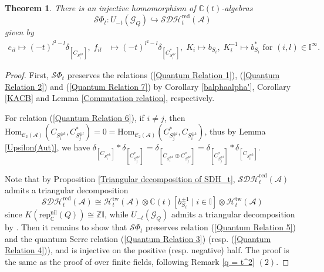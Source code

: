 \documentclass[12pt]{amsart}
\newtheorem{theorem}{Theorem}[section]
\theoremstyle{definition}
\numberwithin{equation}{section}
\begin{document}
\begin{theorem}
    \label{Realization of quantum BB algebra}
    There is an injective homomorphism of $ \mathbb{C}(t) $-algebras
    \[\mathcal{S}\Phi_t : U_{-t}(\mathcal{G}_Q) \hookrightarrow \mathcal{SDH}^{\mathrm{red}}_t(\mathcal{A}) \]
    given by
    \begin{align*}
        e_{il} \mapsto (-t)^{l^2-l} \delta_{[C_{S_i^{\oplus l}}]},\;f_{il} &\mapsto (-t)^{l^2-l} \delta_{[C^*_{S_i^{\oplus l}}]},\; K_i \mapsto b_{S_i} ,\; K_i^{-1} \mapsto b_{S_i}^* \text{ for } (i,l) \in \mathbb{I}^{\infty}.
    \end{align*}
\end{theorem}
\begin{proof}
    First, $ \mathcal{S}\Phi_t $ preserves the relations  (\ref{Quantum Relation 1}), (\ref{Quantum Relation 2}) and (\ref{Quantum Relation 7}) by Corollary \ref{balphaalpha'}, Corollary \ref{KACB} and Lemma \ref{Commutation relation}, respectively. 
    
    For relation (\ref{Quantum Relation 6}), if $ i \ne j $, then $ \mathrm{Hom}_{\mathcal{C}_2(\mathcal{A})}(C_{S_i^{\oplus k}}, C_{S_j^{\oplus l}}^*) = 0 = \mathrm{Hom}_{\mathcal{C}_2(\mathcal{A})}(C_{S_j^{\oplus l}}^*,C_{S_i^{\oplus k}}) $, thus by Lemma \ref{Upsilon(Aut)}, we have $ \delta_{[C_{S_i^{\oplus k}}]} * \delta_{[C_{S_j^{\oplus l}}^*]} = \delta_{[C_{S_i^{\oplus k}} \oplus C_{S_j^{\oplus l}}^*]}  = \delta_{[C_{S_j^{\oplus l}}^*]} * \delta_{[C_{S_i^{\oplus k}}]}  $. 

    Note that by Proposition \ref{Triangular decomposition of SDH_t}, $ \mathcal{SDH}_t^{\mathrm{red}}(\mathcal{A}) $ admits a triangular decomposition 
    \[\mathcal{SDH}^{\mathrm{red}}_t(\mathcal{A}) \cong \mathcal{H}_t^{\mathrm{tw}}(\mathcal{A}) \otimes \mathbb{C}(t)[b_{S_i}^{\pm 1}\mid i \in \mathbb{I}]  \otimes \mathcal{H}_t^{\mathrm{tw}}(\mathcal{A})\]
    since $ K( \mathrm{rep}^{\mathrm{nil}}_{\mathbb{C}}(Q)) \cong \mathbb{Z}\mathbb{I} $, while $ U_{-t}(\mathcal{G}_Q) $ admits a triangular decomposition by \cite[Theorem 3.2]{KangKim20}. 
    Then it remains to show that $ \mathcal{S}\Phi_t $ preserves relation (\ref{Quantum Relation 5}) and the quantum Serre relation (\ref{Quantum Relation 3}) (resp. (\ref{Quantum Relation 4})), and is injective on the positive (resp. negative) half. 
    The proof is the same as the proof of \cite[Proposition 3.9, Theorem 4.2]{Kang18} over finite fields, following Remark \ref{q = t^2} $ (2) $. 
   
\end{proof}
\end{document}
